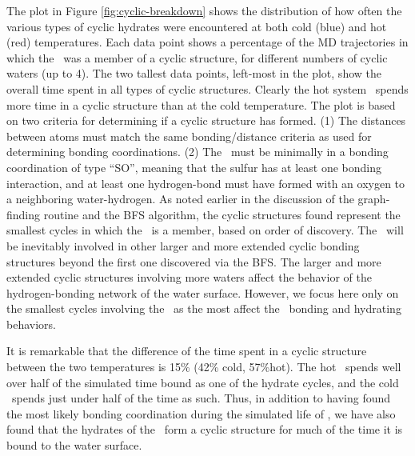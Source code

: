 The plot in Figure \ref{fig:cyclic-breakdown} shows the distribution of how often the various types of cyclic hydrates were encountered at both cold (blue) and hot (red) temperatures. Each data point shows a percentage of the MD trajectories in which the \suldiox~was a member of a cyclic structure, for different numbers of cyclic waters (up to 4). The two tallest data points, left-most in the plot, show the overall time spent in all types of cyclic structures. Clearly the hot system \suldiox~spends more time in a cyclic structure than at the cold temperature. The plot is based on two criteria for determining if a cyclic structure has formed. (1) The distances between atoms must match the same bonding/distance criteria as used for determining bonding coordinations. (2) The \suldiox~must be minimally in a bonding coordination of type ``SO'', meaning that the sulfur has at least one bonding interaction, and at least one hydrogen-bond must have formed with an oxygen to a neighboring water-hydrogen. As noted earlier in the discussion of the graph-finding routine and the BFS algorithm, the cyclic structures found represent the smallest cycles in which the \suldiox~is a member, based on order of discovery. The \suldiox~will be inevitably involved in other larger and more extended cyclic bonding structures beyond the first one discovered via the BFS. The larger and more extended cyclic structures involving more waters affect the behavior of the hydrogen-bonding network of the water surface. However, we focus here only on the smallest cycles involving the \suldiox~as the most affect the \suldiox~bonding and hydrating behaviors.

It is remarkable that the difference of the time spent in a cyclic structure between the two temperatures is 15\% (42\% cold, 57\%hot). The hot \suldiox~spends well over half of the simulated time bound as one of the hydrate cycles, and the cold \suldiox~spends just under half of the time as such. Thus, in addition to having found the most likely bonding coordination during the simulated life of \suldiox, we have also found that the hydrates of the \suldiox~form a cyclic structure for much of the time it is bound to the water surface.

